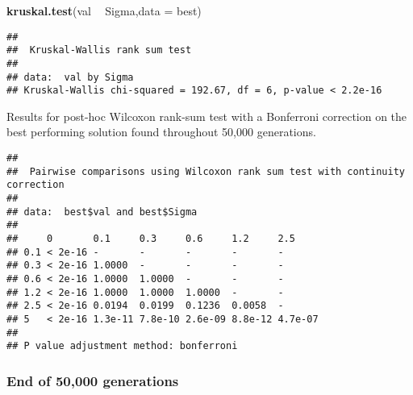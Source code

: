 \documentclass[]{book}
\newenvironment{Shaded}{\begin{snugshade}}{\end{snugshade}}
\newcommand{\DataTypeTok}[1]{\textcolor[rgb]{0.13,0.29,0.53}{#1}}
\newcommand{\KeywordTok}[1]{\textcolor[rgb]{0.13,0.29,0.53}{\textbf{#1}}}
\newcommand{\NormalTok}[1]{#1}
\newcommand{\OperatorTok}[1]{\textcolor[rgb]{0.81,0.36,0.00}{\textbf{#1}}}
\newcommand{\OtherTok}[1]{\textcolor[rgb]{0.56,0.35,0.01}{#1}}
\newcommand{\StringTok}[1]{\textcolor[rgb]{0.31,0.60,0.02}{#1}}
\begin{document}
\begin{Shaded}
\begin{Highlighting}[]
\KeywordTok{kruskal.test}\NormalTok{(val }\OperatorTok{~}\StringTok{ }\NormalTok{Sigma,}\DataTypeTok{data =}\NormalTok{ best)}
\end{Highlighting}
\end{Shaded}

\begin{verbatim}
## 
##  Kruskal-Wallis rank sum test
## 
## data:  val by Sigma
## Kruskal-Wallis chi-squared = 192.67, df = 6, p-value < 2.2e-16
\end{verbatim}

Results for post-hoc Wilcoxon rank-sum test with a Bonferroni correction on the best performing solution found throughout 50,000 generations.

\begin{Shaded}
\end{Shaded}

\begin{verbatim}
## 
##  Pairwise comparisons using Wilcoxon rank sum test with continuity correction 
## 
## data:  best$val and best$Sigma 
## 
##     0       0.1     0.3     0.6     1.2     2.5    
## 0.1 < 2e-16 -       -       -       -       -      
## 0.3 < 2e-16 1.0000  -       -       -       -      
## 0.6 < 2e-16 1.0000  1.0000  -       -       -      
## 1.2 < 2e-16 1.0000  1.0000  1.0000  -       -      
## 2.5 < 2e-16 0.0194  0.0199  0.1236  0.0058  -      
## 5   < 2e-16 1.3e-11 7.8e-10 2.6e-09 8.8e-12 4.7e-07
## 
## P value adjustment method: bonferroni
\end{verbatim}

\hypertarget{end-of-50000-generations-34}{%
\subsubsection{End of 50,000 generations}\label{end-of-50000-generations-34}}
\end{document}
